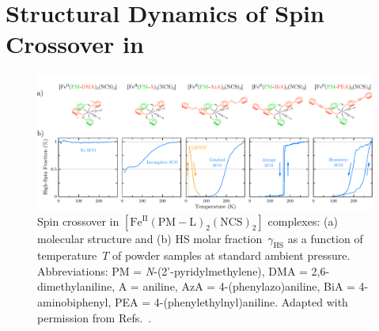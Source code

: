 


\section[Structural Dynamics of Spin Crossover in \protect{[Fe\textsuperscript{II}(PM-AzA)\textsubscript{2}(NCS)\textsubscript{2}]}]{Structural Dynamics of Spin Crossover in \\ }
\label{sec: UED-AZA}


\begin{figure}[ht!]
  \centering
  \includegraphics[width = \textwidth]{Figures/fig_AZA_intro.pdf}
  \caption[Spin crossover in $\mathrm{[Fe^{II}(PM-L)_2 (NCS)_2]}$ complexes.]{
    Spin crossover in $\mathrm{[Fe^{II}(PM-L)_2 (NCS)_2]}$ complexes:
    (a) molecular structure and
    (b) HS molar fraction~$\gamma_\text{HS}$ as a function of temperature~$T$
    of powder samples at standard ambient pressure.
    Abbreviations:
    PM = \textit{N}-(2'-pyridylmethylene),
    DMA = 2,6-dimethylaniline,
    A = aniline,
    AzA = 4-(phenylazo)aniline,
    BiA = 4-aminobiphenyl,
    PEA = 4-(phenylethylnyl)aniline.
    Adapted with permission from Refs.~\cite{Ksenofontov1998, Capes2000}.
  }
  \label{fig: AZA-intro}
\end{figure}

